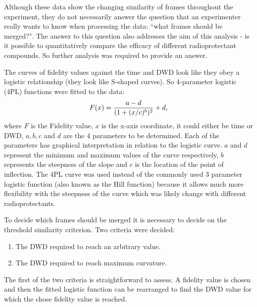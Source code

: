Although these data show the changing similarity of frames throughout the experiment, they do not necessarily answer the question that an experimenter really wants to know when processing the data: ``what frames should be merged?".
The answer to this question also addresses the aim of this analysis - is it possible to quantitatively compare the efficacy of different radioprotectant compounds.
So further analysis was required to provide an answer.

The curves of fidelity values against the time and DWD look like they obey a logistic relationship (they look like S-shaped curves).
So 4-parameter logistic (4PL) functions were fitted to the data:
\begin{equation}
    F(x) = \frac{a - d}{(1 + (x/c)^b)^2} + d,
    \label{eq:4PL}
\end{equation}
where $F$ is the Fidelity value, $x$ is the x-axis coordinate, it could either be time or DWD, $a, b, c$ and $d$ are the 4 parameters to be determined.
Each of the parameters has graphical interpretation in relation to the logistic curve.
$a$ and $d$ represent the minimum and maximum values of the curve respectively, $b$ represents the steepness of the slope and $c$ is the location of the point of inflection.
The 4PL curve was used instead of the commonly used 3 parameter logistic function (also known as the Hill function) because it allows much more flexibility with the steepness of the curve which was likely change with different radioprotectants.

To decide which frames should be merged it is necessary to decide on the threshold similarity criterion.
Two criteria were decided:
\begin{enumerate}
    \item The DWD required to reach an arbitrary value.
    \item The DWD required to reach maximum curvature.
\end{enumerate}
The first of the two criteria is straightforward to assess.
A fidelity value is chosen and then the fitted logistic function can be rearranged to find the DWD value for which the chose fidelity value is reached.

